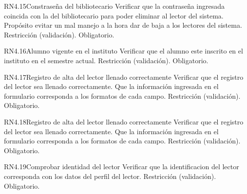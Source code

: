 
\begin{BussinesRule}{RN4.15}{Constraseña del bibliotecario} 
	\BRitem[Descripción:] Verificar que la contraseña ingresada coincida con la del bibliotecario para poder eliminar al lector del sistema. Propósito evitar un mal manejo a la hora dar de baja a los lectores del sistema. 	
	\BRitem[Tipo:] Restricción (validación).
	\BRitem[Nivel:] Obligatorio.
\end{BussinesRule}


\begin{BussinesRule}{RN4.16}{Alumno vigente en el instituto} 
	\BRitem[Descripción:] Verificar que el alumno este inscrito en el instituto en el semestre actual.
	\BRitem[Tipo:] Restricción (validación).
	\BRitem[Nivel:] Obligatorio.
\end{BussinesRule}


\begin{BussinesRule}{RN4.17}{Registro de alta del lector llenado correctamente } 
	\BRitem[Descripción:] Verificar que el registro del lector sea llenado correctamente. Que la información ingresada en el formulario corresponda a los formatos de cada campo.
	\BRitem[Tipo:] Restricción (validación).
	\BRitem[Nivel:] Obligatorio.
\end{BussinesRule}


\begin{BussinesRule}{RN4.18}{Registro de alta del lector llenado correctamente } 
	\BRitem[Descripción:] Verificar que el registro del lector sea llenado correctamente. Que la información ingresada en el formulario corresponda a los formatos de cada campo.
	\BRitem[Tipo:] Restricción (validación).
	\BRitem[Nivel:] Obligatorio.
\end{BussinesRule}


\begin{BussinesRule}{RN4.19}{Comprobar identidad del lector } 
	\BRitem[Descripción:] Verificar que la identificacion del lector corresponda con los datos del perfil del lector.
	\BRitem[Tipo:] Restricción (validación).
	\BRitem[Nivel:] Obligatorio.
\end{BussinesRule}

